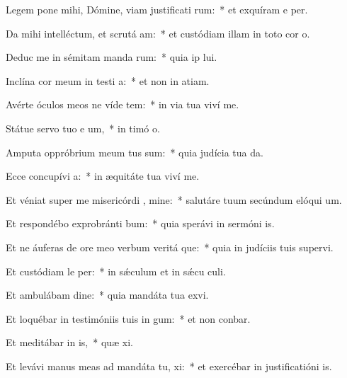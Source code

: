 \item Legem pone mihi, Dómine, viam justificati rum:~* et exquíram e per.
\item Da mihi intelléctum, et scrutá  am:~* et custódiam illam in toto cor o.
\item Deduc me in sémitam manda rum:~* quia ip lui.
\item Inclína cor meum in testi a:~* et non in atiam.
\item Avérte óculos meos ne víde tem:~* in via tua viví me.
\item Státue servo tuo e um,~* in timó o.
\item Amputa oppróbrium meum  tus sum:~* quia judícia tua da.
\item Ecce concupívi  a:~* in æquitáte tua viví me.
\item Et véniat super me misericórdi , mine:~* salutáre tuum secúndum elóqui um.
\item Et respondébo exprobránti  bum:~* quia sperávi in sermóni is.
\item Et ne áuferas de ore meo verbum veritá que:~* quia in judíciis tuis supervi.
\item Et custódiam le  per:~* in sǽculum et in sǽcu culi.
\item Et ambulábam  dine:~* quia mandáta tua exvi.
\item Et loquébar in testimóniis tuis in  gum:~* et non conbar.
\item Et meditábar in  is,~* quæ xi.
\item Et levávi manus meas ad mandáta tu,  xi:~* et exercébar in justificatióni is.
